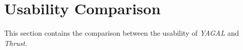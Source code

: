\section{Usability Comparison} \label{sec:comparisoncomparison}
This section contains the comparison between the usability of \textit{YAGAL} and \textit{Thrust}. 

